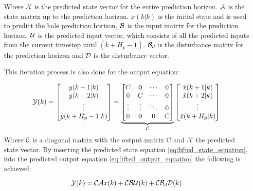 Where $\CMcal{X}$ is the predicted state vector for the entire prediction horizon. $\CMcal{A}$ is the state matrix up to the prediction horizon. $x(k|k)$ is the initial state and is used to predict the hole prediction horizon, $\CMcal{B}$ is the input matrix for the prediction horizon, $\CMcal{U}$ is the predicted input vector, which consists of all the predicted inputs from the current timestep until $(k+H_p-1)$. $\CMcal{B}_d$ is the disturbance matrix for the prediction horizon and $\CMcal{D}$ is the disturbance vector. 

This iteration process is also done for the output equation:

\begin{equation}\label{eq:lifted_output_equation}
	\CMcal{Y}(k)= 
	\begin{bmatrix}
	y(k+1|k)\\
	y(k+2|k)\\
	\vdots\\
	y(k+H_p-1|k)
	\end{bmatrix}
	= 
	\underbrace{\begin{bmatrix}
	C 		& 0 	&\cdots	& 0\\
	0 		& C 	&\cdots & 0 \\
	\vdots	& \vdots&\ddots & 0\\
	0 		& 0		&0 		& C
	\end{bmatrix}}_{\CMcal{C}}
	  \begin{bmatrix}
	  \hat{x}(k+1|k) 	\\
	  \hat{x}(k+2|k) 	\\
	  \vdots 			\\
	  \hat{x}(k+H_p|k) 	\\
	   \end{bmatrix}
\end{equation}
Where $\CMcal{C}$ is a diagonal matrix with the output matrix C and $\CMcal{X}$ the predicted state vector. By inserting the predicted state equation \ref{eq:lifted_state_equation}, into the predicted output equation \ref{eq:lifted_output_equation} the following is achieved:

\begin{equation}\label{eq:output_eq_with_state_eq}
	\CMcal{Y}(k) =  \CMcal{C}\CMcal{A}x(k) +  \CMcal{C}\CMcal{B}\CMcal{U}(k) +\CMcal{C}\CMcal{B}_d\CMcal{D}(k)
\end{equation}   

